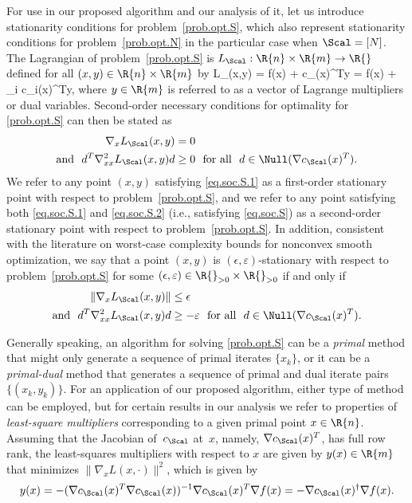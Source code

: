 For use in our proposed algorithm and our analysis of it, let us introduce stationarity conditions for problem~\eqref{prob.opt.S}, which also represent stationarity conditions for problem~\eqref{prob.opt.N} in the particular case when $\Scal = [N]$.  The Lagrangian of problem~\eqref{prob.opt.S} is $L_\Scal : \R{n} \times \R{m} \to \R{}$ defined for all $(x,y) \in \R{n} \times \R{m}$ by
\bequationNN
  L_\Scal(x,y) = f(x) + c_\Scal(x)^Ty = f(x) +  \sum_{i \in \Scal} c_i(x)^Ty,
\eequationNN
where $y \in \R{m}$ is referred to as a vector of Lagrange multipliers or dual variables.  Second-order necessary conditions for optimality for \eqref{prob.opt.S} can then be stated as
\bsubequations\label{eq.soc.S}
  \begin{align}
    \nabla_x L_\Scal(x,y) &= 0 \label{eq.soc.S.1} \\ \text{and}\ \ 
    d^T \nabla_{xx}^2 L_\Scal(x,y)d &\geq 0\ \ \text{for all}\ \ d \in \Null(\nabla c_\Scal(x)^T). \label{eq.soc.S.2}
  \end{align}
\esubequations
We refer to any point $(x,y)$ satisfying \eqref{eq.soc.S.1} as a first-order stationary point with respect to problem~\eqref{prob.opt.S}, and we refer to any point satisfying both \eqref{eq.soc.S.1} and \eqref{eq.soc.S.2} (i.e., satisfying \eqref{eq.soc.S}) as a second-order stationary point with respect to problem~\eqref{prob.opt.S}.  In addition, consistent with the literature on worst-case complexity bounds for nonconvex smooth optimization, we say that a point $(x,y)$ is $(\epsilon,\varepsilon)$-stationary with respect to problem~\eqref{prob.opt.S} for some $(\epsilon,\varepsilon) \in \R{}_{>0} \times \R{}_{>0}$ if and only if
\bsubequations\label{eq.soc.S.approx}
  \begin{align}
    \|\nabla_x L_\Scal(x,y)\| &\leq \epsilon \label{eq.soc.S.approx.1} \\ \text{and}\ \ 
    d^T \nabla_{xx}^2 L_\Scal(x,y)d &\geq -\varepsilon\ \ \text{for all}\ \ d \in \Null(\nabla c_\Scal(x)^T). \label{eq.soc.S.approx.2}
  \end{align}
\esubequations

Generally speaking, an algorithm for solving \eqref{prob.opt.S} can be a \emph{primal} method that might only generate a sequence of primal iterates $\{x_k\}$, or it can be a \emph{primal-dual} method that generates a sequence of primal and dual iterate pairs $\{(x_k,y_k)\}$.  For an application of our proposed algorithm, either type of method can be employed, but for certain results in our analysis we refer to properties of \emph{least-square multipliers} corresponding to a given primal point $x \in \R{n}$.  Assuming that the Jacobian of~$c_\Scal$ at~$x$, namely, $\nabla c_\Scal(x)^T$, has full row rank, the least-squares multipliers with respect to $x$ are given by $y(x) \in \R{m}$ that minimizes $\|\nabla_x L(x,\cdot)\|^2$, which is given by
\begin{equation}\label{eq.lsm}
  y(x) = - (\nabla c_\Scal(x)^T \nabla c_\Scal(x))^{-1} \nabla c_\Scal(x)^T \nabla f(x) = - \nabla c_\Scal(x)^\dag \nabla f(x).
\end{equation}

